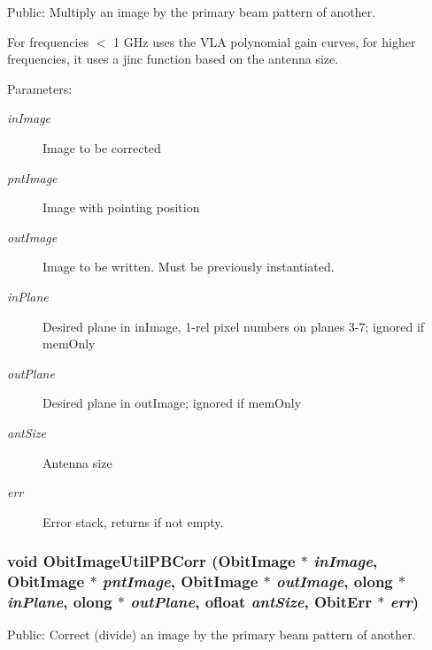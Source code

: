 Public: Multiply an image by the primary beam pattern of another. 

For frequencies $<$ 1 GHz uses the VLA polynomial gain curves, for higher frequencies, it uses a jinc function based on the antenna size. \begin{Desc}
\item[Parameters:]
\begin{description}
\item[{\em in\-Image}]Image to be corrected \item[{\em pnt\-Image}]Image with pointing position \item[{\em out\-Image}]Image to be written. Must be previously instantiated. \item[{\em in\-Plane}]Desired plane in in\-Image, 1-rel pixel numbers on planes 3-7; ignored if mem\-Only \item[{\em out\-Plane}]Desired plane in out\-Image; ignored if mem\-Only \item[{\em ant\-Size}]Antenna size \item[{\em err}]Error stack, returns if not empty. \end{description}
\end{Desc}
\subsubsection{\setlength{\rightskip}{0pt plus 5cm}void Obit\-Image\-Util\-PBCorr ({\bf Obit\-Image} $\ast$ {\em in\-Image}, {\bf Obit\-Image} $\ast$ {\em pnt\-Image}, {\bf Obit\-Image} $\ast$ {\em out\-Image}, {\bf olong} $\ast$ {\em in\-Plane}, {\bf olong} $\ast$ {\em out\-Plane}, {\bf ofloat} {\em ant\-Size}, {\bf Obit\-Err} $\ast$ {\em err})}\label{ObitImageUtil_8h_a9}


Public: Correct (divide) an image by the primary beam pattern of another. 

